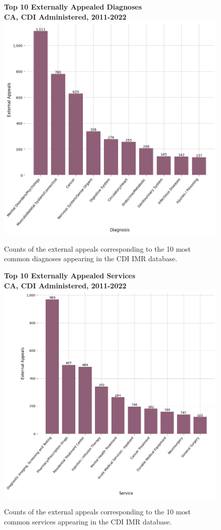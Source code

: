 \documentclass[12pt, a4paper,twoside,parskip=full]{report}
\theoremstyle{plain} %
\theoremstyle{definition} %
\theoremstyle{remark} %
\numberwithin{equation}{chapter}
\begin{document}
		\begin{figure}[h!]
			\centering
			\textbf{Top 10 Externally Appealed Diagnoses}\\
			\textbf{CA, CDI Administered, 2011-2022}\\
			\includegraphics[width=.8\textwidth]{images/ca_doi_external_appeals/top_externally_appealed_diagnoses.png}
			\caption{Counts of the external appeals corresponding to the 10 most common diagnoses appearing in the CDI IMR database.}
			\label{cacdiexternalappealsbydiagnosis}
		\end{figure}
		\clearpage
	
	
		\begin{figure}[h!]
			\centering
			\textbf{Top 10 Externally Appealed Services}\\
			\textbf{CA, CDI Administered, 2011-2022}\\
			\includegraphics[width=.8\textwidth]{images/ca_doi_external_appeals/top_externally_appealed_treatments.png}
			\caption{Counts of the external appeals corresponding to the 10 most common services appearing in the CDI IMR database.}
			\label{cacdiexternalappealsbyservice}
		\end{figure}
		\clearpage
	
\end{document}
